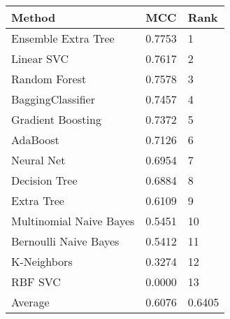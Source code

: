 \begin{tabular}{|l|l|l| }
\hline
Method                  & MCC & Rank \\ \hline
Ensemble Extra Tree     & 0.7753 & 1\\
Linear SVC              & 0.7617 & 2\\
Random Forest           & 0.7578 & 3\\
BaggingClassifier       & 0.7457 & 4\\
Gradient Boosting       & 0.7372 & 5\\
AdaBoost                & 0.7126 & 6\\
Neural Net              & 0.6954 & 7\\
Decision Tree           & 0.6884 & 8\\
Extra Tree              & 0.6109 & 9\\
Multinomial Naive Bayes & 0.5451 & 10\\
Bernoulli Naive Bayes   & 0.5412 & 11\\
K-Neighbors             & 0.3274 & 12\\
RBF SVC                 & 0.0000 & 13\\
Average & 0.6076 & 0.6405 & \\
\hline
\end{tabular}